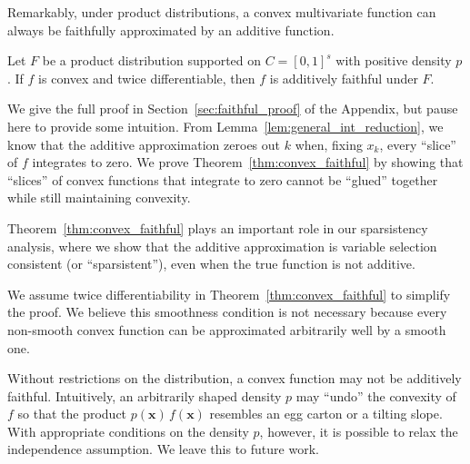 Remarkably, under product distributions, a convex multivariate function can always be faithfully approximated by an additive function. 

\begin{theorem}
\label{thm:convex_faithful}
Let $F$ be a product distribution supported on $C=[0,1]^s$ with positive density $p$. If $f$ is convex and twice differentiable, then $f$ is additively faithful under $F$.
\end{theorem}

We give the full proof in Section~\ref{sec:faithful_proof} of the
Appendix, but pause here to provide some intuition. From
Lemma~\ref{lem:general_int_reduction}, we know that the
additive approximation zeroes out $k$ when, fixing $x_k$, every
``slice'' of $f$ integrates to zero. We prove
Theorem~\ref{thm:convex_faithful} by showing that ``slices'' of convex
functions that integrate to zero cannot be ``glued'' together while
still maintaining convexity.

Theorem~\ref{thm:convex_faithful} plays an important role in our
sparsistency analysis, where we show that the additive
approximation is variable selection consistent (or ``sparsistent''), even when the true function is not
additive.

\begin{remark}
  We assume twice differentiability in
  Theorem~\ref{thm:convex_faithful} to simplify the proof. We believe
  this smoothness condition is not necessary because every non-smooth
  convex function can be approximated arbitrarily well by a smooth
  one.  
\end{remark}
\begin{remark}
Without restrictions on the distribution, a convex
  function may not be additively faithful. Intuitively, an arbitrarily shaped
  density $p$
  may ``undo'' the convexity of $f$ so that the product
  $p(\mathbf{x}) \, f(\mathbf{x})$ resembles an egg carton or a
  tilting slope.  With appropriate conditions on the density $p$,
  however, it is possible to relax the independence assumption.  We leave this to
  future work.
\end{remark}
